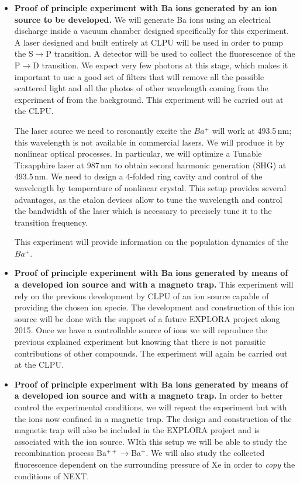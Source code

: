\begin{itemize}
 \item \textbf{Proof of principle experiment with Ba ions generated by an ion source to be developed.}    
We will generate Ba ions using an electrical discharge inside a vacuum chamber designed specifically for this experiment. A laser designed and built entirely at CLPU will be used in order to pump the S$\rightarrow$P transition. A detector will be used to collect the fluorescence of the P$\rightarrow$D transition. We expect  very few photons at this stage, which makes it important to use a good set of filters that will remove all the possible scattered light and all the photos of other wavelength coming from the experiment of from the background. This experiment will be carried out at the CLPU.

The laser source we need to resonantly excite the $Ba^{+}$ will work at 493.5\,nm; this wavelength is not available in commercial lasers. We will produce it by nonlinear optical processes. In particular, we will optimize a Tunable Ti:sapphire laser at 987\,nm to obtain second harmonic generation (SHG) at 493.5\,nm. We need to design a 4-folded ring cavity and control of the wavelength by temperature of nonlinear crystal. This setup provides several advantages, as the etalon devices allow to tune the wavelength and control the bandwidth of the laser which is necessary to precisely tune it to the transition frequency.

This experiment will provide information on the population dynamics of the  $Ba^{+}$. 

\item \textbf{Proof of principle experiment with Ba ions generated by means of a developed ion source and with a magneto trap.}   
This experiment will rely on the previous development by CLPU of an ion source capable of providing the chosen ion specie. The development and construction of this ion source will be done with the support of a future EXPLORA project along 2015. Once we have a controllable source of ions we will reproduce the previous explained experiment  but knowing that there is not parasitic contributions of other compounds. The experiment will again be carried out at the CLPU.

 \item \textbf{Proof of principle experiment with Ba ions generated by means of a developed ion source and with a magneto trap.}
 In order to better control the experimental conditions, we will repeat the experiment but with the ions now confined in a magnetic trap. The design and construction of the magnetic trap will also be included in the EXPLORA project and is associated with the ion source. WIth this setup we will be able to study the recombination process Ba$^{++}\rightarrow$Ba$^{+}$. We will also study the collected fluorescence dependent on the surrounding pressure of Xe in order to \emph{copy} the conditions of NEXT.
 

\end{itemize}
